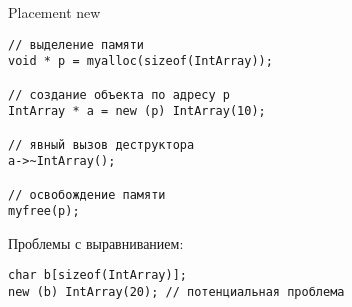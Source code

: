 \documentclass{beamer}
\begin{document}
\begin{frame}[fragile]{Placement new}{}
\begin{lstlisting}
// выделение памяти
void * p = myalloc(sizeof(IntArray));

// создание объекта по адресу p
IntArray * a = new (p) IntArray(10);

// явный вызов деструктора 
a->~IntArray();

// освобождение памяти
myfree(p);
\end{lstlisting}
Проблемы с выравниванием:
\begin{lstlisting}
char b[sizeof(IntArray)];
new (b) IntArray(20); // потенциальная проблема
\end{lstlisting}
\end{frame}
\end{document}
